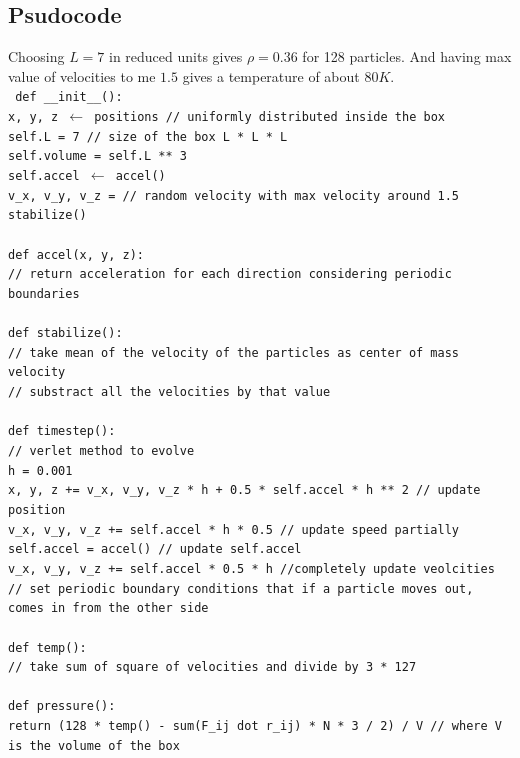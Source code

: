\documentclass[12pt, a4paper]{article}
\begin{document}
	\newpage
	\subsection{Psudocode}
	Choosing $L = 7$ in reduced units gives $\rho = 0.36$ for 128 particles. And having max value of velocities to me $1.5$ gives a temperature of about $80 K$.\\
	
	\noindent\texttt{
	\noindent def \_\_init\_\_():\\
	x, y, z $\leftarrow$ positions // uniformly distributed inside the box\\
	self.L = 7  // size of the box L * L * L\\
	self.volume = self.L ** 3 \\
	self.accel $\leftarrow$ accel() \\ 
	v\_x, v\_y, v\_z = // random velocity with max velocity around 1.5\\ 
	stabilize()\\ \\
	def accel(x, y, z):\\
		// return acceleration for each direction considering periodic boundaries\\ \\
	def stabilize():\\
		// take mean of the velocity of the particles as center of mass velocity\\
		// substract all the velocities by that value\\ \\
	def timestep():\\
		// verlet method to evolve\\
		h = 0.001\\
		x, y, z += v\_x, v\_y, v\_z * h + 0.5 * self.accel * h ** 2 // update position\\
		v\_x, v\_y, v\_z += self.accel * h * 0.5 // update speed partially\\
		self.accel = accel() // update self.accel \\
		v\_x, v\_y, v\_z += self.accel * 0.5 * h //completely update veolcities\\ 
		// set periodic boundary conditions that if a particle moves out, comes in from the other side\\ \\
		def temp():\\
		// take sum of square of velocities and divide by 3 * 127 \\ \\
		def pressure():\\
		return (128 * temp() - sum(F\_ij dot r\_ij) * N * 3 / 2) / V // where V is the volume of the box\\ \\
	}
\end{document}
